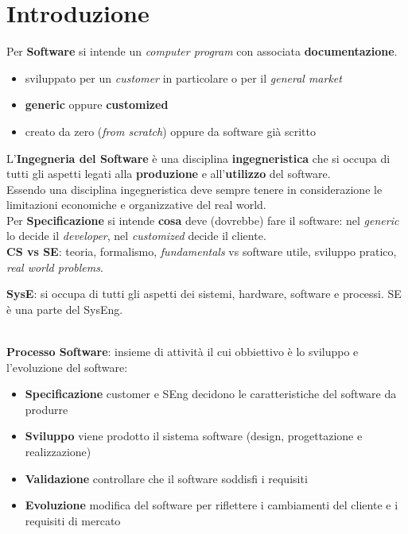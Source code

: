 \chapter{Introduzione}
Per \textbf{Software} si intende un \textit{computer program}
con associata \textbf{documentazione}.
\begin{itemize}
    \item sviluppato per un \textit{customer} in particolare
          o per il \textit{general market}
    \item \textbf{generic} oppure \textbf{customized}
    \item creato da zero (\textit{from scratch}) oppure da software gi\`a
          scritto
\end{itemize}

L'\textbf{Ingegneria del Software} \`e una disciplina \textbf{ingegneristica}
che si occupa di tutti gli aspetti legati alla \textbf{produzione} e
all'\textbf{utilizzo} del software. \\
Essendo una disciplina ingegneristica deve sempre tenere in considerazione
le limitazioni economiche e organizzative del real world.
\\

Per \textbf{Specificazione} si intende \textbf{cosa} deve (dovrebbe)
fare il software: nel \textit{generic} lo decide il \textit{developer},
nel \textit{customized} decide il cliente.
\\

\textbf{CS vs SE}: teoria, formalismo, \textit{fundamentals} vs
software utile, sviluppo pratico, \textit{real world problems}.

\textbf{SysE}: si occupa di tutti gli aspetti dei sistemi, hardware,
software e processi. SE \`e una parte del SysEng.
\\~\\

\noindent
{}

\newpage
\textbf{Processo Software}: insieme di attivit\`a il cui obbiettivo
\`e lo sviluppo e l'evoluzione del software:
\begin{itemize}
      \item \textbf{Specificazione} customer e SEng decidono le
            caratteristiche del software da produrre
      \item \textbf{Sviluppo} viene prodotto il sistema software
            (design, progettazione e realizzazione)
      \item \textbf{Validazione} controllare che il software
            soddisfi i requisiti
      \item \textbf{Evoluzione} modifica del software per riflettere
            i cambiamenti del cliente e i requisiti di mercato
\end{itemize}

